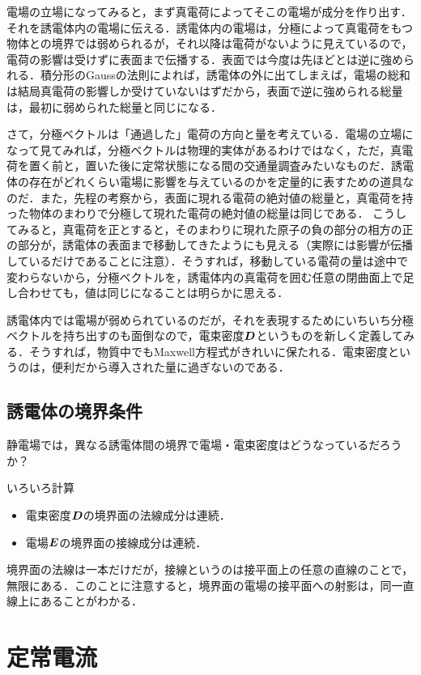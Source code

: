 \documentclass[a4paper,10pt,uplatex]{jsarticle}
\newcommand{\E}{\vb*{E}}
\newcommand{\D}{\vb*{D}}
\begin{document}
電場の立場になってみると，まず真電荷によってそこの電場が成分を作り出す．それを誘電体内の電場に伝える．誘電体内の電場は，分極によって真電荷をもつ物体との境界では弱められるが，それ以降は電荷がないように見えているので，電荷の影響は受けずに表面まで伝播する．表面では今度は先ほどとは逆に強められる．積分形のGaussの法則によれば，誘電体の外に出てしまえば，電場の総和は結局真電荷の影響しか受けていないはずだから，表面で逆に強められる総量は，最初に弱められた総量と同じになる．

さて，分極ベクトルは「通過した」電荷の方向と量を考えている．電場の立場になって見てみれば，分極ベクトルは物理的実体があるわけではなく，ただ，真電荷を置く前と，置いた後に定常状態になる間の交通量調査みたいなものだ．誘電体の存在がどれくらい電場に影響を与えているのかを定量的に表すための道具なのだ．また，先程の考察から，表面に現れる電荷の絶対値の総量と，真電荷を持った物体のまわりで分極して現れた電荷の絶対値の総量は同じである．
こうしてみると，真電荷を正とすると，そのまわりに現れた原子の負の部分の相方の正の部分が，誘電体の表面まで移動してきたようにも見える（実際には影響が伝播しているだけであることに注意）．そうすれば，移動している電荷の量は途中で変わらないから，分極ベクトルを，誘電体内の真電荷を囲む任意の閉曲面上で足し合わせても，値は同じになることは明らかに思える．

誘電体内では電場が弱められているのだが，それを表現するためにいちいち分極ベクトルを持ち出すのも面倒なので，電束密度$\D$というものを新しく定義してみる．そうすれば，物質中でもMaxwell方程式がきれいに保たれる．電束密度というのは，便利だから導入された量に過ぎないのである．

\subsection{誘電体の境界条件}
静電場では，異なる誘電体間の境界で電場・電束密度はどうなっているだろうか？

\begin{center}
    いろいろ計算
\end{center}

\begin{itemize}
    \item 電束密度$\D$の境界面の法線成分は連続．
    \item 電場$\E$の境界面の接線成分は連続．
\end{itemize}
境界面の法線は一本だけだが，接線というのは接平面上の任意の直線のことで，無限にある．このことに注意すると，境界面の電場の接平面への射影は，同一直線上にあることがわかる．

\section{定常電流}
\end{document}
